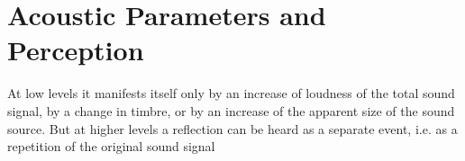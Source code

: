 \section{Acoustic Parameters and Perception}
At low levels it manifests itself only by an increase of loudness of the total sound signal, by a change in timbre, or by an increase of the apparent size of the sound source. But at higher levels a reflection can be heard as a separate event, i.e. as a repetition of the original sound signal
